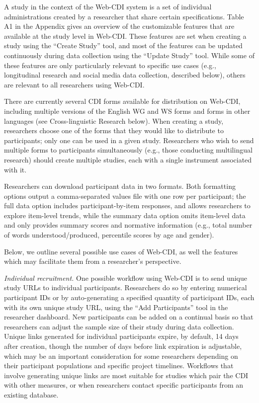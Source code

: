 \documentclass[
  english,
  ,man,floatsintext]{apa6}
\begin{document}
A study in the context of the Web-CDI system is a set of individual administrations created by a researcher that share certain specifications. Table A1 in the Appendix gives an overview of the customizable features that are available at the study level in Web-CDI. These features are set when creating a study using the \enquote{Create Study} tool, and most of the features can be updated continuously during data collection using the \enquote{Update Study} tool. While some of these features are only particularly relevant to specific use cases (e.g., longitudinal research and social media data collection, described below), others are relevant to all researchers using Web-CDI.

There are currently several CDI forms available for distribution on Web-CDI, including multiple versions of the English WG and WS forms and forms in other languages (see Cross-linguistic Research below). When creating a study, researchers choose one of the forms that they would like to distribute to participants; only one can be used in a given study. Researchers who wish to send multiple forms to participants simultaneously (e.g., those conducting multilingual research) should create multiple studies, each with a single instrument associated with it.

Researchers can download participant data in two formats. Both formatting options output a comma-separated values file with one row per participant; the full data option includes participant-by-item responses, and allows researchers to explore item-level trends, while the summary data option omits item-level data and only provides summary scores and normative information (e.g., total number of words understood/produced, percentile scores by age and gender).

Below, we outline several possible use cases of Web-CDI, as well the features which may facilitate them from a researcher's perspective.

\emph{Individual recruitment.} One possible workflow using Web-CDI is to send unique study URLs to individual participants. Researchers do so by entering numerical participant IDs or by auto-generating a specified quantity of participant IDs, each with its own unique study URL, using the \enquote{Add Participants} tool in the researcher dashboard. New participants can be added on a continual basis so that researchers can adjust the sample size of their study during data collection. Unique links generated for individual participants expire, by default, 14 days after creation, though the number of days before link expiration is adjustable, which may be an important consideration for some researchers depending on their participant populations and specific project timelines. Workflows that involve generating unique links are most suitable for studies which pair the CDI with other measures, or when researchers contact specific participants from an existing database.
\end{document}
